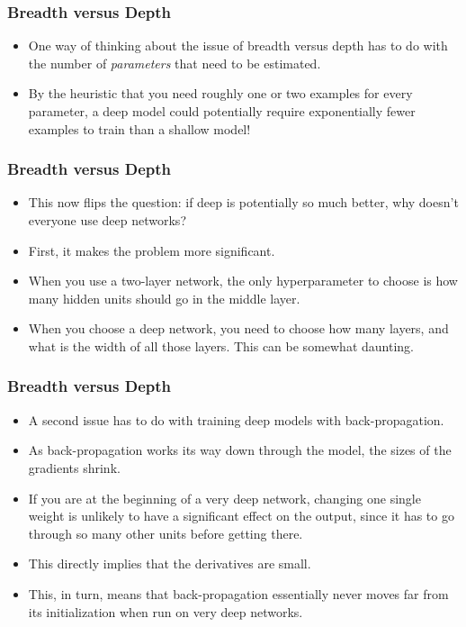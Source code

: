 \documentclass[trans]{beamer}
\begin{document}

\begin{frame}
  \frametitle{Breadth versus Depth}
\begin{itemize}
\item
One way of thinking about the issue of breadth versus depth has to do
with the number of \emph{parameters} that need to be estimated.  
\item By
the heuristic that you need roughly one or two examples for every
parameter, a deep model could potentially require exponentially fewer
examples to train than a shallow model!
\end{itemize}
\end{frame}

\begin{frame}
  \frametitle{Breadth versus Depth}
\begin{itemize}
\item
This now flips the question: if deep is potentially so much better,
why doesn't everyone use deep networks? 
\item   First, it makes the  problem
more significant.
\item When you use a two-layer network, the only
hyperparameter to choose is how many hidden units should go in the
middle layer.
\item  When you choose a deep network, you need to choose how
many layers, and what is the width of all those layers.  This can be
somewhat daunting.
\end{itemize}
\end{frame}

\begin{frame}
  \frametitle{Breadth versus Depth}
\begin{itemize}
\item
A second issue has to do with training deep models with
back-propagation. 
\item  As back-propagation works its way down
through the model, the sizes of the gradients shrink.
\item   If you are at the
beginning of a very deep network, changing one single weight is
unlikely to have a significant effect on the output, since it has to
go through so many other units before getting there. 
\item  This directly
implies that the derivatives are small.  
\item This, in turn, means that
back-propagation essentially never moves far from its initialization
when run on very deep networks.
\end{itemize}
\end{frame}
\end{document}
